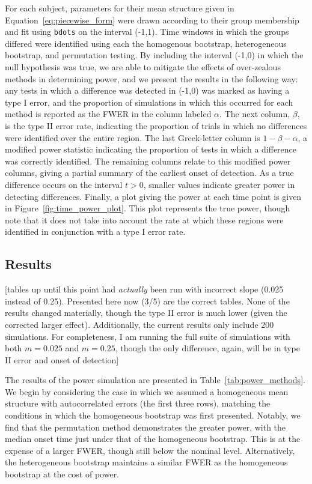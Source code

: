 \documentclass{article}
\newcommand{\xt}{\texttt}
\begin{document}
For each subject, parameters for their mean structure given in Equation~\ref{eq:piecewise_form} were drawn according to their group membership and fit using \xt{bdots} on the interval (-1,1). Time windows in which the groups differed were identified using each the homogenous bootstrap, heterogeneous bootstrap, and permutation testing. By including the interval (-1,0) in which the null hypothesis was true, we are able to mitigate the effects of over-zealous methods in determining power, and we present the results in the following way: any tests in which a difference was detected in (-1,0) was marked as having a type I error, and the proportion of simulations in which this occurred for each method is reported as the FWER in the column labeled $\alpha$. The next column, $\beta$, is the type II error rate, indicating the proportion of trials in which no differences were identified over the entire region. The last Greek-letter column is $1 - \beta - \alpha$, a modified power statistic indicating the proportion of tests in which a difference was correctly identified. The remaining columns relate to this modified power columns, giving a partial summary of the earliest onset of detection. As a true difference occurs on the interval $t > 0$, smaller values indicate greater power in detecting differences. Finally, a plot giving the power at each time point is given in Figure~\ref{fig:time_power_plot}. This plot represents the true power, though note that it does not take into account the rate at which these regions were identified in conjunction with a type I error rate.


\subsection{Results}

[tables up until this point had \textit{actually} been run with incorrect slope (0.025 instead of 0.25). Presented here now (3/5) are the correct tables. None of the results changed materially, though the type II error is much lower (given the corrected larger effect). Additionally, the current results only include 200 simulations. For completeness, I am running the full suite of simulations with both $m = 0.025$ and $m = 0.25$, though the only difference, again, will be in type II error and onset of detection]

The results of the power simulation are presented in Table~\ref{tab:power_methods}. We begin by considering the case in which we assumed a homogeneous mean structure with autocorrelated errors (the first three rows), matching the conditions in which the homogeneous bootstrap was first presented. Notably, we find that the permutation method demonstrates the greater power, with the median onset time just under that of the homogeneous bootstrap. This is at the expense of a larger FWER, though still below the nominal level. Alternatively, the heterogeneous bootstrap maintains a similar FWER as the homogeneous bootstrap at the cost of power.
\end{document}
